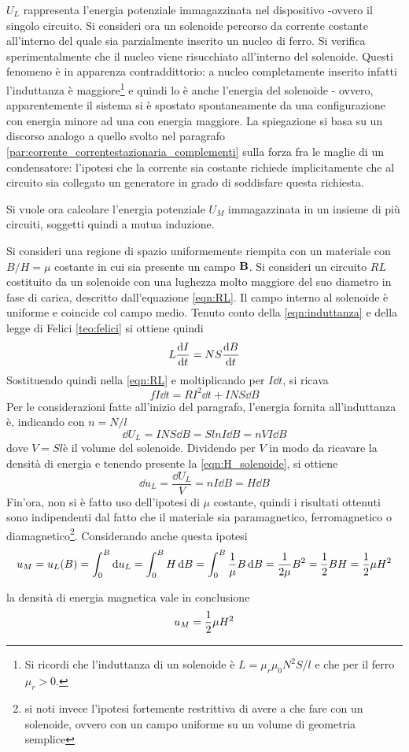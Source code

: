 $U_L$ rappresenta l'energia potenziale immagazzinata nel dispositivo -ovvero il singolo circuito.
Si consideri ora un solenoide percorso da corrente costante all'interno del quale sia parzialmente inserito un nucleo di ferro.
Si verifica sperimentalmente che il nucleo viene risucchiato all'interno del solenoide. Questi fenomeno è in apparenza contraddittorio:
a nucleo completamente inserito infatti l'induttanza è maggiore\footnote{Si ricordi che l'induttanza di un solenoide è
$L=\mu_r\mu_0 N^2S/l$ e che per il ferro $\mu_r>0$.} e quindi lo è anche l'energia del solenoide - ovvero, apparentemente
il sistema si è spostato spontaneamente da una configurazione con energia minore ad una con energia maggiore. La spiegazione
si basa su un discorso analogo a quello svolto nel paragrafo \ref{par:corrente_correntestazionaria_complementi}
sulla forza fra le maglie di un condensatore: l'ipotesi che la corrente sia costante richiede implicitamente
che al circuito sia collegato un generatore in grado di soddisfare questa richiesta.

Si vuole ora calcolare l'energia potenziale $U_M$ immagazzinata in un insieme di più circuiti, soggetti quindi
a mutua induzione.
\begin{example}
    Si consideri una regione di spazio uniformemente riempita con un materiale
    con $B/H=\mu$ costante
    in cui sia presente un campo $\vb{B}$.
    Si consideri un circuito $RL$ costituito da un solenoide con una lughezza molto maggiore del suo diametro in fase di carica,
    descritto dall'equazione \eqref{eqn:RL}.
    Il campo interno al solenoide è uniforme e coincide col campo medio. Tenuto conto della \eqref{eqn:induttanza}
    e della legge di Felici \ref{teo:felici} si ottiene quindi
    \[
        L\dv{I}{t}=NS\dv{B}{t}
    \]
    Sostituendo quindi nella \eqref{eqn:RL} e moltiplicando per $I\dd{t}$, si ricava
    \[
        fI\dd{t}=RI^2\dd{t}+INS\dd{B}
    \]
    Per le considerazioni fatte all'inizio del paragrafo, l'energia fornita all'induttanza è, indicando con $n=N/l$
    \[
        \dd{U}_L=INS\dd{B}=SlnI\dd{B}=nVI\dd{B}
    \]
    dove $V=Sl$è il volume del solenoide. Dividendo per $V$ in modo da ricavare la densità di energia
    e tenendo presente la \eqref{eqn:H_solenoide}, si ottiene
    \[
        \dd{u}_L=\frac{\dd{U}_L}{V}=nI\dd{B}=H\dd{B}
    \]
    Fin'ora, non si è fatto uso dell'ipotesi di $\mu$ costante, quindi i risultati ottenuti sono indipendenti dal fatto che il
    materiale sia paramagnetico, ferromagnetico o diamagnetico\footnote{
        si noti invece l'ipotesi fortemente restrittiva di avere a che fare con un solenoide, ovvero con un campo uniforme su un volume
        di geometria semplice}.
    Considerando anche questa ipotesi
    \[
        u_M=u_L(B)=\int_0^B \dd{u}_L=\int_0^B H\dd{B}=\int_0^B \frac{1}{\mu}B\dd{B}=\frac{1}{2\mu}B^2=\frac{1}{2}BH=\frac{1}{2}\mu H^2
    \]


    la densità di energia magnetica vale in conclusione
    \begin{equation}
        u_M=\frac{1}{2}\mu H^2
    \end{equation}
\end{example}

